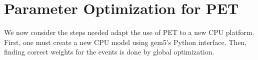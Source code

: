 \chapter{Parameter Optimization for PET}

We now consider the steps needed adapt the use of PET to a new CPU platform.
First, one must create a new CPU model using gem5's Python interface. Then,
finding correct weights for the events is done by global optimization.







